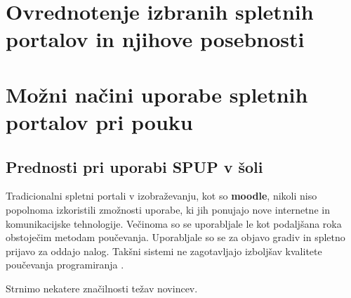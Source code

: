 \section{Ovrednotenje izbranih spletnih portalov in njihove posebnosti}
\label{sec:pregled_spletnih_portalov}


\section{Možni načini uporabe spletnih portalov pri pouku}
\label{sec:načini_uporabe_sp}

\subsection{Prednosti pri uporabi SPUP v šoli }
\label{sec:Prednosti_pri_uporavi_SPUP}




Tradicionalni spletni portali v izobraževanju, kot so \textbf{moodle},
nikoli niso popolnoma izkoristili zmožnosti uporabe, ki jih ponujajo
nove internetne in komunikacijske tehnologije. Večinoma so se
uporabljale le kot podaljšana roka obstoječim metodam
poučevanja. Uporabljale so se za objavo gradiv in spletno prijavo za
oddajo nalog. Takšni sistemi ne zagotavljajo izboljšav kvalitete
poučevanja programiranja \cite{ITaLCP_DistanceEdu}.

Strnimo nekatere značilnosti težav novincev.

